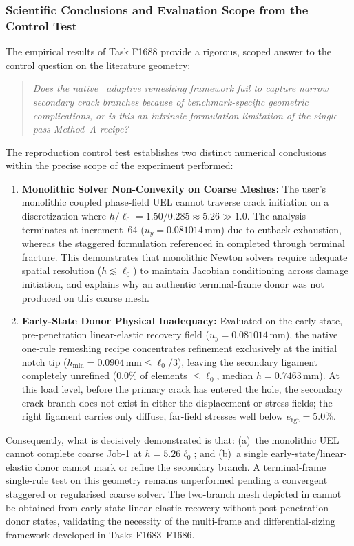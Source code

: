 \subsubsection{Scientific Conclusions and Evaluation Scope from the Control Test}
The empirical results of Task F1688 provide a rigorous, scoped answer to the control question on the literature geometry:
\begin{quote}
\emph{Does the native \MISESERI\ adaptive remeshing framework fail to capture narrow secondary crack branches because of benchmark-specific geometric complications, or is this an intrinsic formulation limitation of the single-pass Method~A recipe?}
\end{quote}
The reproduction control test establishes two distinct numerical conclusions within the precise scope of the experiment performed:
\begin{enumerate}
  \item \textbf{Monolithic Solver Non-Convexity on Coarse Meshes:} The user's monolithic coupled phase-field UEL cannot traverse crack initiation on a discretization where $h / \ell_0 = 1.50 / 0.285 \approx 5.26 \gg 1.0$. The analysis terminates at increment~64 ($u_y = 0.081014\,\mathrm{mm}$) due to cutback exhaustion, whereas the staggered formulation referenced in \citet{pandey2025} completed through terminal fracture. This demonstrates that monolithic Newton solvers require adequate spatial resolution ($h \lesssim \ell_0$) to maintain Jacobian conditioning across damage initiation, and explains why an authentic terminal-frame donor was not produced on this coarse mesh.
  \item \textbf{Early-State Donor Physical Inadequacy:} Evaluated on the early-state, pre-penetration linear-elastic recovery field ($u_y = 0.081014\,\mathrm{mm}$), the native one-rule remeshing recipe concentrates refinement exclusively at the initial notch tip ($h_{\min} = 0.0904\,\mathrm{mm} \le \ell_0/3$), leaving the secondary ligament completely unrefined ($0.0\%$ of elements $\le \ell_0$, median $h = 0.7463\,\mathrm{mm}$). At this load level, before the primary crack has entered the hole, the secondary crack branch does not exist in either the displacement or stress fields; the right ligament carries only diffuse, far-field stresses well below $e_{\mathrm{tgt}} = 5.0\%$.
\end{enumerate}
Consequently, what is decisively demonstrated is that: (a)~the monolithic UEL cannot complete coarse Job-1 at $h = 5.26\ell_0$; and (b)~a single early-state/linear-elastic donor cannot mark or refine the secondary branch. A terminal-frame single-rule test on this geometry remains unperformed pending a convergent staggered or regularised coarse solver. The two-branch mesh depicted in \citet[Fig.~16b]{pandey2025} cannot be obtained from early-state linear-elastic recovery without post-penetration donor states, validating the necessity of the multi-frame and differential-sizing framework developed in Tasks F1683--F1686.



